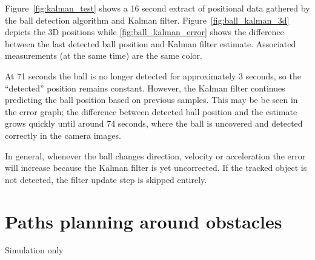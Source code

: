 Figure~\ref{fig:kalman_test} shows a 16 second extract of positional data gathered by the ball detection algorithm and Kalman filter.
Figure~\ref{fig:ball_kalman_3d} depicts the 3D positions while \ref{fig:ball_kalman_error} shows the difference between the last detected ball position and Kalman filter estimate. Associated measurements (at the same time) are the same color.

At 71 seconds the ball is no longer detected for approximately 3 seconds, so the ``detected'' position remains constant. However, the Kalman filter continues predicting the ball position based on previous samples. This may be be seen in the error graph; the difference between detected ball position and the estimate grows quickly until around 74 seconds, where the ball is uncovered and detected correctly in the camera images.

In general, whenever the ball changes direction, velocity or acceleration the error will increase because the Kalman filter is yet uncorrected. If the tracked object is not detected, the filter update step is skipped entirely.


\section{Paths planning around obstacles}
Simulation only



%         

%         

%             
%             

